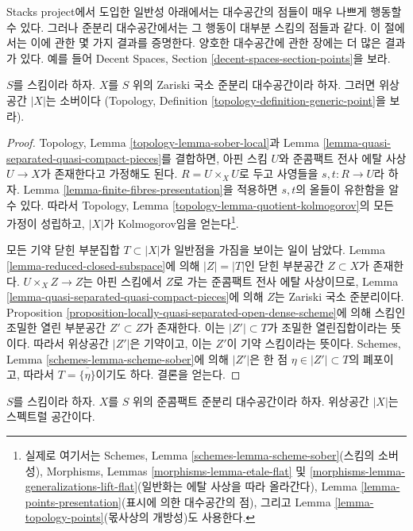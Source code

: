 \noindent
Stacks project에서 도입한 일반성 아래에서는 대수공간의 점들이 매우
나쁘게 행동할 수 있다. 그러나 준분리 대수공간에서는 그 행동이 대부분
스킴의 점들과 같다. 이 절에서는 이에 관한 몇 가지 결과를 증명한다.
양호한 대수공간에 관한 장에는 더 많은 결과가 있다. 예를 들어
Decent Spaces, Section \ref{decent-spaces-section-points}을 보라.

\begin{lemma}
\label{lemma-quasi-separated-sober}
$S$를 스킴이라 하자. $X$를 $S$ 위의 Zariski 국소 준분리
대수공간이라 하자. 그러면 위상공간 $|X|$는 소버이다
(Topology, Definition \ref{topology-definition-generic-point}을 보라).
\end{lemma}

\begin{proof}
Topology, Lemma \ref{topology-lemma-sober-local}과 Lemma
\ref{lemma-quasi-separated-quasi-compact-pieces}를 결합하면,
아핀 스킴 $U$와 준콤팩트 전사 에탈 사상 $U \to X$가 존재한다고
가정해도 된다. $R = U \times_X U$로 두고 사영들을
$s, t : R \to U$라 하자. Lemma \ref{lemma-finite-fibres-presentation}을
적용하면 $s, t$의 올들이 유한함을 알 수 있다. 따라서 Topology, Lemma
\ref{topology-lemma-quotient-kolmogorov}의 모든 가정이 성립하고,
$|X|$가 Kolmogorov임을 얻는다\footnote{실제로 여기서는 Schemes, Lemma
\ref{schemes-lemma-scheme-sober}(스킴의 소버성), Morphisms, Lemmas
\ref{morphisms-lemma-etale-flat} 및
\ref{morphisms-lemma-generalizations-lift-flat}(일반화는 에탈 사상을 따라
올라간다), Lemma \ref{lemma-points-presentation}(표시에 의한 대수공간의
점), 그리고 Lemma \ref{lemma-topology-points}(몫사상의 개방성)도 사용한다.}.

\medskip\noindent
모든 기약 닫힌 부분집합 $T \subset |X|$가 일반점을 가짐을 보이는 일이
남았다. Lemma \ref{lemma-reduced-closed-subspace}에 의해
$|Z| = |T|$인 닫힌 부분공간 $Z \subset X$가 존재한다.
$U \times_X Z \to Z$는 아핀 스킴에서 $Z$로 가는 준콤팩트 전사 에탈
사상이므로, Lemma \ref{lemma-quasi-separated-quasi-compact-pieces}에 의해
$Z$는 Zariski 국소 준분리이다. Proposition
\ref{proposition-locally-quasi-separated-open-dense-scheme}에 의해
스킴인 조밀한 열린 부분공간 $Z' \subset Z$가 존재한다.
이는 $|Z'| \subset T$가 조밀한 열린집합이라는 뜻이다. 따라서 위상공간
$|Z'|$은 기약이고, 이는 $Z'$이 기약 스킴이라는 뜻이다. Schemes, Lemma
\ref{schemes-lemma-scheme-sober}에 의해 $|Z'|$은 한 점
$\eta \in |Z'| \subset T$의 폐포이고, 따라서
$T = \overline{\{\eta\}}$이기도 하다. 결론을 얻는다.
\end{proof}

\begin{lemma}
\label{lemma-quasi-compact-quasi-separated-spectral}
$S$를 스킴이라 하자. $X$를 $S$ 위의 준콤팩트 준분리 대수공간이라 하자.
위상공간 $|X|$는 스펙트럴 공간이다.
\end{lemma}

